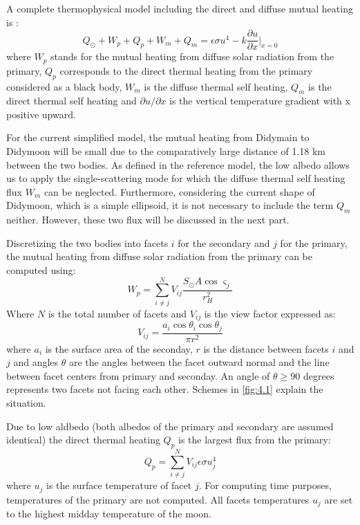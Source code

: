 A complete thermophysical model including the direct and diffuse mutual heating is \citep{pelivan}:
\begin{equation}
    Q_\odot+W_p+Q_p+W_m+Q_m=\epsilon\sigma u^4-k\frac{\partial{u}}{\partial{x}}\Big|_{x=0}
    \label{eq:4.1}
\end{equation}
where $W_p$ stands for the mutual heating from diffuse solar radiation from the primary, $Q_p$ corresponds to the direct thermal heating from the primary considered as a black body, $W_m$ is the diffuse thermal self heating, $Q_m$ is the direct thermal self heating and $\partial{u}/\partial{x}$ is the vertical temperature gradient with x positive upward.

For the current simplified model, the mutual heating from Didymain to Didymoon will be small due to the comparatively large distance of 1.18 km \citep{model} between the two bodies. As defined in the reference model, the low albedo allows us to apply the single-scattering mode for which the diffuse thermal self heating flux $W_m$ can be neglected. Furthermore, considering the current shape of Didymoon, which is a simple ellipsoid, it is not necessary to include the term $Q_m$ neither. However, these two flux will be discussed in the next part.

Discretizing the two bodies into facets $i$ for the secondary and $j$ for the primary, the mutual heating from diffuse solar radiation from the primary can be computed using:
\begin{equation}
    W_p=\sum_{i\neq j}^N V_{ij}\frac{S_{\odot}A\cos\varsigma_j}{r_H^2}
    \label{eq:4.2}
\end{equation}
Where $N$ is the total number of facets and $V_{ij}$ is the view factor expressed as:
\begin{equation}
    V_{ij}=\frac{a_i\cos\theta_i\cos\theta_j}{\pi r^2}
    \label{eq:4.3}
\end{equation}
where $a_i$ is the surface area of the seconday, $r$ is the distance between facets $i$ and $j$ and angles $\theta$ are the angles between the facet outward normal and the line between facet centers from primary and seconday. An angle of $\theta\geq90$ degrees represents two facets not facing each other. Schemes in \autoref{fig:4.1} explain the situation.

Due to low aldbedo (both albedos of the primary and secondary are assumed identical) the direct thermal heating $Q_p$ is the largest flux from the primary:
\begin{equation}
    Q_p=\sum_{i\neq j}^N V_{ij}\epsilon\sigma u^4_{j}
    \label{eq:4.4}
\end{equation}
where $u_{j}$ is the surface temperature of facet $j$. For computing time purposes, temperatures of the primary are not computed. All facets temperatures $u_{j}$ are set to the highest midday temperature of the moon. 

